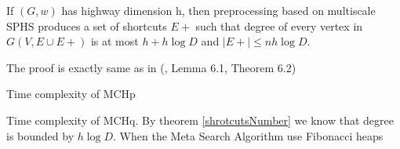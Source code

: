 \begin{theorem}
\label{shrotcutsNumber}
If $(G,w)$ has highway dimension h, then preprocessing based on
multiscale SPHS produces a set of shortcuts $E+$ such that degree of every vertex in
$G(V, E \cup E+)$ is at most $h + h \log D$ and $|E+| \le nh\log D$.
\end{theorem}

The proof is exactly same as in (\cite{abraham2016highway}, Lemma 6.1, Theorem 6.2)

Time complexity of MCHp 

Time complexity of MCHq. By theorem \ref{shrotcutsNumber} we know that degree is 
bounded by $h \log D$. When the Meta Search Algorithm use Fibonacci heaps  







